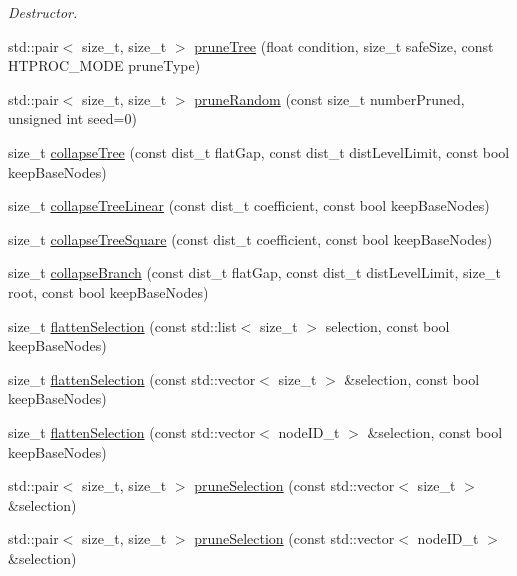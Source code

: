\begin{DoxyCompactItemize}
\begin{DoxyCompactList}\small\item\em \-Destructor. \end{DoxyCompactList}\item 
std\-::pair$<$ size\-\_\-t, size\-\_\-t $>$ \hyperlink{classWHtreeProcesser_adc480c636fbbb5bdadb94160bf67d1dc}{prune\-Tree} (float condition, size\-\_\-t safe\-Size, const \-H\-T\-P\-R\-O\-C\-\_\-\-M\-O\-D\-E prune\-Type)
\item 
std\-::pair$<$ size\-\_\-t, size\-\_\-t $>$ \hyperlink{classWHtreeProcesser_a0555e6e464488cb427f2fefce2772f1e}{prune\-Random} (const size\-\_\-t number\-Pruned, unsigned int seed=0)
\item 
size\-\_\-t \hyperlink{classWHtreeProcesser_a87d26ceede0ff0e7c02aa728c735a89c}{collapse\-Tree} (const dist\-\_\-t flat\-Gap, const dist\-\_\-t dist\-Level\-Limit, const bool keep\-Base\-Nodes)
\item 
size\-\_\-t \hyperlink{classWHtreeProcesser_a6a8740c021ff7e5c184d4de295022775}{collapse\-Tree\-Linear} (const dist\-\_\-t coefficient, const bool keep\-Base\-Nodes)
\item 
size\-\_\-t \hyperlink{classWHtreeProcesser_a6e4315fbfb2b28890035d4d4f2176bc0}{collapse\-Tree\-Square} (const dist\-\_\-t coefficient, const bool keep\-Base\-Nodes)
\item 
size\-\_\-t \hyperlink{classWHtreeProcesser_a800173738287bbb762db126db97a1abd}{collapse\-Branch} (const dist\-\_\-t flat\-Gap, const dist\-\_\-t dist\-Level\-Limit, size\-\_\-t root, const bool keep\-Base\-Nodes)
\item 
size\-\_\-t \hyperlink{classWHtreeProcesser_a7b892bb3a711622e1a7db9ec1f7d8da5}{flatten\-Selection} (const std\-::list$<$ size\-\_\-t $>$ selection, const bool keep\-Base\-Nodes)
\item 
size\-\_\-t \hyperlink{classWHtreeProcesser_a08acf134c0c5de8d3fcafe656891fd3c}{flatten\-Selection} (const std\-::vector$<$ size\-\_\-t $>$ \&selection, const bool keep\-Base\-Nodes)
\item 
size\-\_\-t \hyperlink{classWHtreeProcesser_a318f4cae63a289ed0bb83d0bed866d32}{flatten\-Selection} (const std\-::vector$<$ node\-I\-D\-\_\-t $>$ \&selection, const bool keep\-Base\-Nodes)
\item 
std\-::pair$<$ size\-\_\-t, size\-\_\-t $>$ \hyperlink{classWHtreeProcesser_ad29f534df1c7962c24a9713cf2a8692c}{prune\-Selection} (const std\-::vector$<$ size\-\_\-t $>$ \&selection)
\item 
std\-::pair$<$ size\-\_\-t, size\-\_\-t $>$ \hyperlink{classWHtreeProcesser_af2d78851b8dba93f9d5116d46d0f6a61}{prune\-Selection} (const std\-::vector$<$ node\-I\-D\-\_\-t $>$ \&selection)

\end{DoxyCompactItemize}
